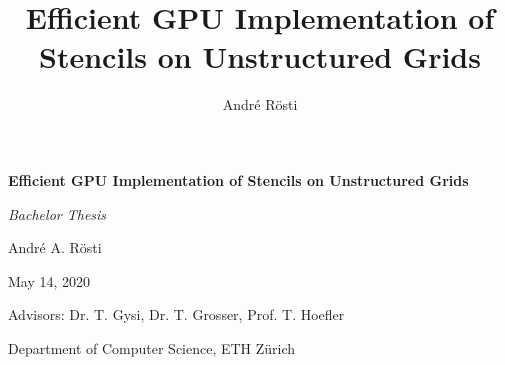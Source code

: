 \documentclass[a4paper, 11pt, oneside]{book}
\title{Efficient GPU Implementation of Stencils on Unstructured Grids}
\author{André Rösti}
\begin{document}
\begin{titlepage}
	\begin{center}
		\vspace*{0cm}
		{\Huge \textbf{Efficient GPU Implementation of Stencils on Unstructured Grids} \par}

		\vfill\vfill\vfill\vfill\vfill\vfill %
		
		{\LARGE \textit{Bachelor Thesis} \par}
		
		\vfill\vfill\vfill\vfill\vfill\vfill\vfill\vfill\vfill\vfill %
		
		{\Large André A. Rösti \par}
		
		\vspace{0.16cm}
		
		{\Large May 14, 2020 \par}
	\end{center}
	
	\vfill\vfill\vfill\vfill\vfill\vfill\vfill\vfill\vfill\vfill\vfill\vfill\vfill\vfill\vfill\vfill %
	
	\raggedleft Advisors: Dr. T. Gysi, Dr. T. Grosser, Prof. T. Hoefler
	
	\vspace{0.1cm}
	
	\raggedleft Department of Computer Science, ETH Zürich
\end{titlepage}
\restoregeometry

\thispagestyle{empty}

\frontmatter

\tableofcontents

\mainmatter













\printbibliography
\end{document}
